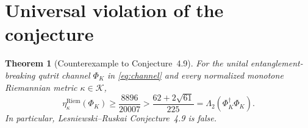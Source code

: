 \documentclass[11pt]{amsart}
\newtheorem{theorem}{Theorem}[section]
\theoremstyle{definition}
\theoremstyle{remark}
\newcommand{\Riem}{\mathrm{Riem}}
\newcommand{\PhiK}{\Phi_K}
\begin{document}
\section{Universal violation of the conjecture}

\begin{theorem}[Counterexample to Conjecture~4.9]\label{thm:main}
For the unital entanglement-breaking qutrit channel $\PhiK$ in \eqref{eq:channel} and every normalized monotone Riemannian metric $\kappa\in\mathcal K$,
\begin{equation}\label{eq:mainineq}
 \eta_\kappa^{\Riem}(\PhiK)
 \ge \frac{8896}{20007}
 >\frac{62+2\sqrt{61}}{225}
 =\Lambda_2(\PhiK^\dagger\PhiK).
\end{equation}
In particular, Lesniewski--Ruskai Conjecture~4.9 is false.
\end{theorem}
\end{document}

